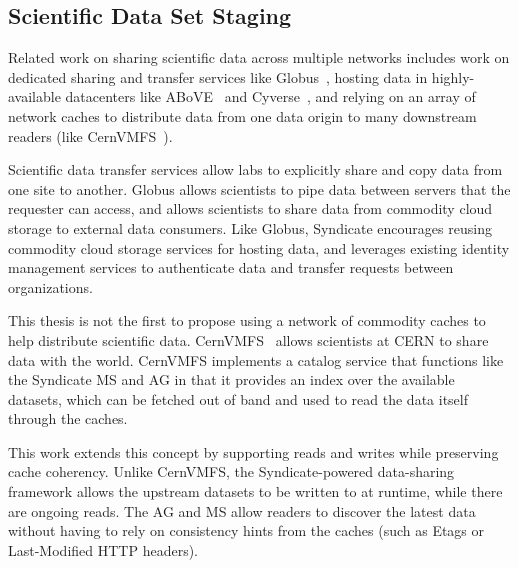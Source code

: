 \subsection{Scientific Data Set Staging}

Related work on sharing scientific data across multiple networks includes
work on dedicated sharing and transfer services like Globus~\cite{globus},
hosting data in highly-available datacenters like ABoVE~\cite{nasa-above} and
Cyverse~\cite{cyverse}, and relying on an array of network caches to distribute
data from one data origin to many downstream readers (like
CernVMFS~\cite{cernvmfs}).

Scientific data transfer services allow labs to explicitly share and copy
data from one site to another.  Globus allows scientists to pipe data between
servers that the requester can access, and allows scientists to share data from
commodity cloud storage to external data consumers.  Like Globus, Syndicate
encourages reusing commodity cloud storage services for hosting data, and
leverages existing identity management services to authenticate data and
transfer requests between organizations.

This thesis is not the first to propose using a network of commodity caches to help
distribute scientific data.  CernVMFS~\cite{cernvmfs} allows scientists at CERN
to share data with the world.  CernVMFS implements a catalog service that
functions like the Syndicate MS and AG in that it provides an index over the
available datasets, which can be fetched out of band and used to read the data
itself through the caches.

This work extends this concept by supporting reads and writes while preserving
cache coherency.  Unlike CernVMFS, the Syndicate-powered data-sharing framework
allows the upstream datasets to be written
to at runtime, while there are ongoing reads.  The AG and MS allow readers to
discover the latest data without having to rely on consistency hints from the
caches (such as Etags or Last-Modified HTTP headers).
